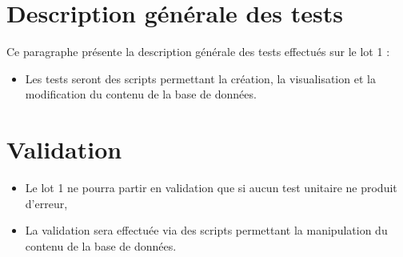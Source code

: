 \section{Description générale des tests}
	Ce paragraphe présente la description générale des tests effectués sur le lot 1 :	
	\begin{itemize}
		\item Les tests seront des scripts permettant la création, la visualisation et la modification du contenu de la base de données.
	\end{itemize}

\section{Validation}	
	\begin{itemize}
		\item Le lot 1 ne pourra partir en validation que si aucun test unitaire ne produit d'erreur,
		\item La validation sera effectuée via des scripts permettant la manipulation du contenu de la base de données.
	\end{itemize}
	
